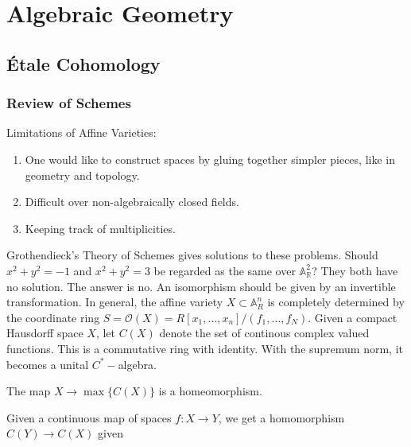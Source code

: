 \documentclass[crop=false,class=article,oneside]{standalone}
\begin{document}
    \ifx\ifmathcoursesalgebraicgeometry\undefined
        \section*{Algebraic Geometry}
        \setcounter{section}{1}
    \fi
    \subsection{\'{E}tale Cohomology}
        \subsubsection{Review of Schemes}
            \begin{remark}
                Limitations of Affine Varieties:
                \begin{enumerate}
                    \item One would like to construct spaces
                          by gluing together simpler pieces,
                          like in geometry and topology.
                    \item Difficult over non-algebraically
                          closed fields.
                    \item Keeping track of multiplicities.
                \end{enumerate}
            \end{remark}
            Grothendieck's Theory of Schemes gives solutions to
            these problems. Should $x^{2}+y^{2}=-1$ and
            $x^{2}+y^{2}=3$ be regarded as the same over
            $\mathbb{A}_{\mathbb{R}}^{2}$? They both have no
            solution. The answer is no. An isomorphism should
            be given by an invertible transformation. In general,
            the affine variety $X\subset\mathbb{A}_{R}^n$ is
            completely determined by the coordinate ring
            $S=\mathcal{O}(X)%
              =R[x_{1},\hdots,x_{n}]/(f_{1},\hdots,f_{N})$.
            Given a compact Hausdorff space $X$, let $C(X)$
            denote the set of continous complex valued functions.
            This is a commutative ring with identity. With the
            supremum norm, it becomes a unital $C^{*}-$algebra.
            \begin{theorem}
                The map $X\rightarrow\max\{C(X)\}$
                is a homeomorphism.
            \end{theorem}
            Given a continuous map of spaces $f:X\rightarrow Y$,
            we get a homomorphism $C(Y)\rightarrow C(X)$ given
\end{document}
